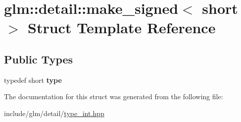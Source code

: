\hypertarget{structglm_1_1detail_1_1make__signed_3_01short_01_4}{}\section{glm\+:\+:detail\+:\+:make\+\_\+signed$<$ short $>$ Struct Template Reference}
\label{structglm_1_1detail_1_1make__signed_3_01short_01_4}
\subsection*{Public Types}
\begin{DoxyCompactItemize}
\item 
\mbox{\label{structglm_1_1detail_1_1make__signed_3_01short_01_4_a9488d8ffbd34998675456fa6d1143989}} 
typedef short {\bfseries type}
\end{DoxyCompactItemize}


The documentation for this struct was generated from the following file\+:\begin{DoxyCompactItemize}
\item 
include/glm/detail/\hyperlink{type__int_8hpp}{type\+\_\+int.\+hpp}\end{DoxyCompactItemize}
